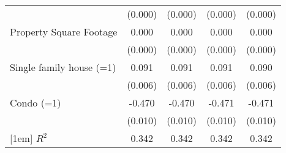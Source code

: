 {\begin{tabular}{l*{4}{c}}
                    &     (0.000)         &     (0.000)         &     (0.000)         &     (0.000)         \\
[1em]
Property Square Footage    &       0.000\sym{***}&       0.000\sym{***}&       0.000\sym{***}&       0.000\sym{***}\\
                    &     (0.000)         &     (0.000)         &     (0.000)         &     (0.000)         \\
[1em]
Single family house (=1)         &       0.091\sym{***}&       0.091\sym{***}&       0.091\sym{***}&       0.090\sym{***}\\
                    &     (0.006)         &     (0.006)         &     (0.006)         &     (0.006)         \\
[1em]
Condo (=1)           &      -0.470\sym{***}&      -0.470\sym{***}&      -0.471\sym{***}&      -0.471\sym{***}\\
                    &     (0.010)         &     (0.010)         &     (0.010)         &     (0.010)         \\

[1em]
\hline
$R^2$                 &       0.342         &       0.342         &       0.342         &       0.342         \\
\hline\hline
\end{tabular}
}
